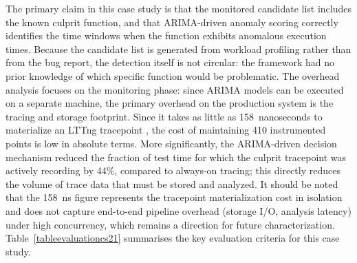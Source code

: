 \documentclass[pdflatex,sn-nature]{sn-jnl}%
\theoremstyle{thmstyleone}%
\theoremstyle{thmstyletwo}%
\theoremstyle{thmstylethree}%
\begin{document}
The primary claim in this case study is that the monitored candidate list includes the known culprit function, and that ARIMA-driven anomaly scoring correctly identifies the time windows when the function exhibits anomalous execution times. Because the candidate list is generated from workload profiling rather than from the bug report, the detection itself is not circular: the framework had no prior knowledge of which specific function would be problematic. The overhead analysis focuses on the monitoring phase: since ARIMA models can be executed on a separate machine, the primary overhead on the production system is the tracing and storage footprint. Since it takes as little as 158~nanoseconds to materialize an LTTng tracepoint \cite{gebai-2018}, the cost of maintaining 410 instrumented points is low in absolute terms. More significantly, the ARIMA-driven decision mechanism reduced the fraction of test time for which the culprit tracepoint was actively recording by 44\%, compared to always-on tracing; this directly reduces the volume of trace data that must be stored and analyzed. It should be noted that the 158~ns figure represents the tracepoint materialization cost in isolation and does not capture end-to-end pipeline overhead (storage I/O, analysis latency) under high concurrency, which remains a direction for future characterization. Table~\ref{tableevaluationcs21} summarises the key evaluation criteria for this case study. 


\begin{table}[tbp]

\centering
{}
\caption{Evaluation | Issue: Driver Communication Between Hardware \& Application | 100 Samples | Case Study: 2}
\label{tableevaluationcs21}
\end{table}
\end{document}

